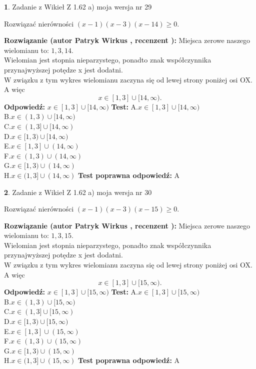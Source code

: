 \documentclass[12pt, a4paper]{article}
\theoremstyle{definition} %
\newtheorem{zad}{}
\newcommand{\zadStart}[1]{\begin{zad}#1\newline}
\newcommand{\zadStop}{\end{zad}}
\newcommand{\rozwStart}[2]{\noindent \textbf{Rozwiązanie (autor #1 , recenzent #2): }\newline}
\newcommand{\rozwStop}{\newline}
\newcommand{\odpStart}{\noindent \textbf{Odpowiedź:}\newline}
\newcommand{\odpStop}{\newline}
\newcommand{\testStart}{\noindent \textbf{Test:}\newline}
\newcommand{\testStop}{\newline}
\newcommand{\kluczStart}{\noindent \textbf{Test poprawna odpowiedź:}\newline}
\newcommand{\kluczStop}{\newline}
\begin{document}
\zadStart{Zadanie z Wikieł Z 1.62 a) moja wersja nr 29}

Rozwiązać nierówności $(x-1)(x-3)(x-14)\ge0$.
\zadStop
\rozwStart{Patryk Wirkus}{}
Miejsca zerowe naszego wielomianu to: $1, 3, 14$.\\
Wielomian jest stopnia nieparzystego, ponadto znak współczynnika przy\linebreak najwyższej potędze x jest dodatni.\\ W związku z tym wykres wielomianu zaczyna się od lewej strony poniżej osi OX. A więc $$x \in [1,3] \cup [14,\infty).$$
\rozwStop
\odpStart
$x \in [1,3] \cup [14,\infty)$
\odpStop
\testStart
A.$x \in [1,3] \cup [14,\infty)$\\
B.$x \in (1,3) \cup [14,\infty)$\\
C.$x \in (1,3] \cup [14,\infty)$\\
D.$x \in [1,3) \cup [14,\infty)$\\
E.$x \in [1,3] \cup (14,\infty)$\\
F.$x \in (1,3) \cup (14,\infty)$\\
G.$x \in [1,3) \cup (14,\infty)$\\
H.$x \in (1,3] \cup (14,\infty)$
\testStop
\kluczStart
A
\kluczStop



\zadStart{Zadanie z Wikieł Z 1.62 a) moja wersja nr 30}

Rozwiązać nierówności $(x-1)(x-3)(x-15)\ge0$.
\zadStop
\rozwStart{Patryk Wirkus}{}
Miejsca zerowe naszego wielomianu to: $1, 3, 15$.\\
Wielomian jest stopnia nieparzystego, ponadto znak współczynnika przy\linebreak najwyższej potędze x jest dodatni.\\ W związku z tym wykres wielomianu zaczyna się od lewej strony poniżej osi OX. A więc $$x \in [1,3] \cup [15,\infty).$$
\rozwStop
\odpStart
$x \in [1,3] \cup [15,\infty)$
\odpStop
\testStart
A.$x \in [1,3] \cup [15,\infty)$\\
B.$x \in (1,3) \cup [15,\infty)$\\
C.$x \in (1,3] \cup [15,\infty)$\\
D.$x \in [1,3) \cup [15,\infty)$\\
E.$x \in [1,3] \cup (15,\infty)$\\
F.$x \in (1,3) \cup (15,\infty)$\\
G.$x \in [1,3) \cup (15,\infty)$\\
H.$x \in (1,3] \cup (15,\infty)$
\testStop
\kluczStart
A
\kluczStop
\end{document}
